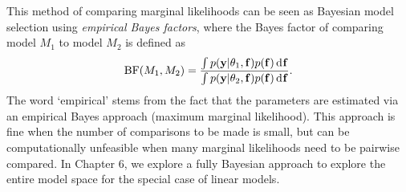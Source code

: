 \begin{remark}
  This method of comparing marginal likelihoods can be seen as Bayesian model selection using \emph{empirical Bayes factors}, where the Bayes factor of comparing model $M_1$ to model $M_2$ is defined as
  \[
    \operatorname{BF}(M_1,M_2) = \frac{\int p({\mathbf y}|\theta_1,{\mathbf f})p({\mathbf f}) \operatorname{d}\hspace{0.5pt}\! {\mathbf f} }{\int p({\mathbf y}|\theta_2,{\mathbf f})p({\mathbf f}) \operatorname{d}\hspace{0.5pt}\! {\mathbf f}}.
  \]
  The word ‘empirical’ stems from the fact that the parameters are estimated via an empirical Bayes approach (maximum marginal likelihood).
  This approach is fine when the number of comparisons to be made is small, but can be computationally unfeasible when many marginal likelihoods need to be pairwise compared.
  In Chapter 6, we explore a fully Bayesian approach to explore the entire model space for the special case of linear models.
\end{remark}

